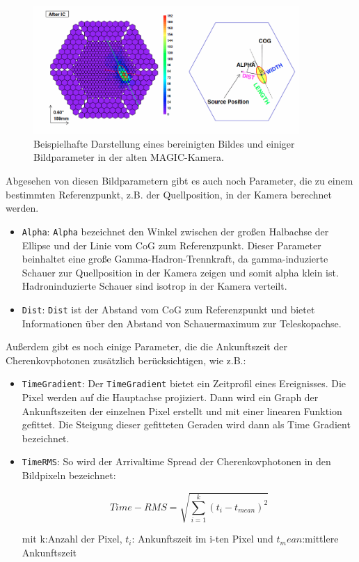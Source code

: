 \begin{figure}
    \centering
    \includegraphics[width=0.9\textwidth]{./Plots/03_MonteCarlos/CleaningBild.png}
    \caption{Beispielhafte Darstellung eines bereinigten Bildes und einiger Bildparameter in der alten MAGIC-Kamera.}
    \label{CleaningBild}
\end{figure}

Abgesehen von diesen Bildparametern gibt es auch noch Parameter, die zu einem bestimmten Referenzpunkt, z.B. der Quellposition, in der Kamera berechnet werden. 

\begin{itemize}
 \item \texttt{Alpha}: \texttt{Alpha} bezeichnet den Winkel zwischen der großen Halbachse der Ellipse und der Linie vom CoG zum Referenzpunkt.
 Dieser Parameter beinhaltet eine große Gamma-Hadron-Trennkraft, da gamma-induzierte Schauer zur Quellposition in der Kamera zeigen und somit alpha klein ist.
 Hadroninduzierte Schauer sind isotrop in der Kamera verteilt.
 \item \texttt{Dist}: \texttt{Dist} ist der Abstand vom CoG zum Referenzpunkt und bietet Informationen über den Abstand von Schauermaximum zur Teleskopachse.
\end{itemize}

Außerdem gibt es noch einige Parameter, die die Ankunftszeit der Cherenkovphotonen zusätzlich berücksichtigen, wie z.B.:

\begin{itemize}
 \item \texttt{TimeGradient}: Der \texttt{TimeGradient} bietet ein Zeitprofil eines Ereignisses.
 Die Pixel werden auf die Hauptachse projiziert.
 Dann wird ein Graph der Ankunftszeiten der einzelnen Pixel erstellt und mit einer linearen Funktion gefittet.
 Die Steigung dieser gefitteten Geraden wird dann als Time Gradient bezeichnet.
 \item \texttt{TimeRMS}: So wird der Arrivaltime Spread der Cherenkovphotonen in den Bildpixeln bezeichnet:
 
\begin{equation}
 Time-RMS=\sqrt{\sum_{i=1}^k (t_i-t_{mean})^2}
\end{equation}
 \begin{centering}
  \small{mit k:Anzahl der Pixel, $t_i$: Ankunftszeit im i-ten Pixel und $t_mean$:mittlere Ankunftszeit}
 \end{centering}


\end{itemize}

